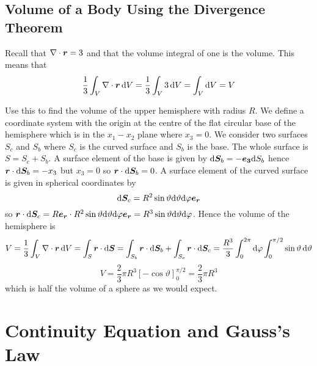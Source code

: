 \documentclass{article}
\begin{document}
    \subsection{Volume of a Body Using the Divergence Theorem}
    Recall that \(\nabla\cdot\bm{r} = 3\) and that the volume integral of one is the volume.
    This means that
    \[\frac{1}{3}\int_V\nabla\cdot\bm{r}\,\dd V = \frac{1}{3}\int_V 3\,\dd V = \int_V\dd V = V\]
    
    \example
    Use this to find the volume of the upper hemisphere with radius \(R\).
    We define a coordinate system with the origin at the centre of the flat circular base of the hemisphere which is in the \(x_1{-}x_2\) plane where \(x_3 = 0\).
    We consider two surfaces \(S_c\) and \(S_b\) where \(S_c\) is the curved surface and \(S_b\) is the base.
    The whole surface is \(S = S_c + S_b\).
    A surface element of the base is given by \(\dd\bm{S}_b = -\bm{e_{3}}\dd S_b\) hence \(\bm{r}\cdot\dd\bm{S}_b = -x_3\) but \(x_3 = 0\) so \(\bm{r}\cdot\dd\bm{S}_b = 0\).
    A surface element of the curved surface is given in spherical coordinates by
    \[\dd\bm{S}_c = R^2\sin\vartheta\dd\vartheta\dd\varphi\bm{e_{r}}\]
    so \(\bm{r}\cdot\dd\bm{S}_c = R\bm{e_{r}}\cdot R^2\sin\vartheta\dd\vartheta\dd\varphi\bm{e_{r}} =R^3\sin\vartheta\dd\vartheta\dd\varphi\).
    Hence the volume of the hemisphere is
    \[V = \frac{1}{3}\int_V\nabla\cdot\bm{r}\,\dd V = \int_S\bm{r}\cdot\dd\bm{S} = \int_{S_b}\bm{r}\cdot\dd\bm{S}_b + \int_{S_c}\bm{r}\cdot\dd\bm{S}_c = \frac{R^3}{3}\int_0^{2\pi}\dd\varphi\int_0^{\pi/2}\sin\vartheta\,\dd\vartheta\]
    \[V = \frac{2}{3}\pi R^3[-\cos\vartheta]_0^{\pi/2} = \frac{2}{3}\pi R^3\]
    which is half the volume of a sphere as we would expect.
    
    \section{Continuity Equation and Gauss's Law}
\end{document}
